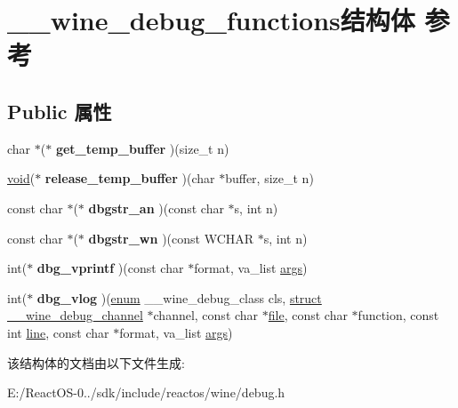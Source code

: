 \hypertarget{struct____wine__debug__functions}{}\section{\+\_\+\+\_\+wine\+\_\+debug\+\_\+functions结构体 参考}
\label{struct____wine__debug__functions}
\subsection*{Public 属性}
\begin{DoxyCompactItemize}
\item 
\mbox{\label{struct____wine__debug__functions_a713c05bb83a4b0845490e486a35944f0}} 
char $\ast$($\ast$ {\bfseries get\+\_\+temp\+\_\+buffer} )(size\+\_\+t n)
\item 
\mbox{\label{struct____wine__debug__functions_aca026806d55d6f5761b1647934dde9ad}} 
\hyperlink{interfacevoid}{void}($\ast$ {\bfseries release\+\_\+temp\+\_\+buffer} )(char $\ast$buffer, size\+\_\+t n)
\item 
\mbox{\label{struct____wine__debug__functions_ab75f30e8b4626da8cb54667c3e355722}} 
const char $\ast$($\ast$ {\bfseries dbgstr\+\_\+an} )(const char $\ast$s, int n)
\item 
\mbox{\label{struct____wine__debug__functions_ab4dbc03626c6b3f5b317846b6813de6a}} 
const char $\ast$($\ast$ {\bfseries dbgstr\+\_\+wn} )(const W\+C\+H\+AR $\ast$s, int n)
\item 
\mbox{\label{struct____wine__debug__functions_a2e95b5b70885385c154d7283b7db2a0b}} 
int($\ast$ {\bfseries dbg\+\_\+vprintf} )(const char $\ast$format, va\+\_\+list \hyperlink{structargs}{args})
\item 
\mbox{\label{struct____wine__debug__functions_a3f68026c23872c9da574945bde82bc12}} 
int($\ast$ {\bfseries dbg\+\_\+vlog} )(\hyperlink{interfaceenum}{enum} \+\_\+\+\_\+wine\+\_\+debug\+\_\+class cls, \hyperlink{interfacestruct}{struct} \hyperlink{struct____wine__debug__channel}{\+\_\+\+\_\+wine\+\_\+debug\+\_\+channel} $\ast$channel, const char $\ast$\hyperlink{structfile}{file}, const char $\ast$function, const int \hyperlink{structline}{line}, const char $\ast$format, va\+\_\+list \hyperlink{structargs}{args})
\end{DoxyCompactItemize}


该结构体的文档由以下文件生成\+:\begin{DoxyCompactItemize}
\item 
E\+:/\+React\+O\+S-\/0../sdk/include/reactos/wine/debug.\+h\end{DoxyCompactItemize}
